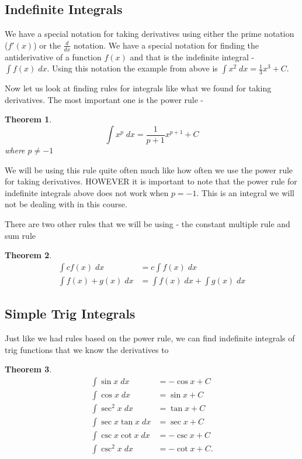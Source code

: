 \documentclass[12pt,reqno]{article}
\newtheorem{Theorem}{Theorem}
\theoremstyle{definition}
\begin{document}
\subsection{Indefinite Integrals} 

We have a special notation for taking derivatives using either the prime notation ($f'(x)$) or the $\frac{d}{dx}$ notation. We have a special notation for finding the antiderivative of a function $f(x)$ and that is the indefinite integral - $\int f(x) \; dx$.  Using this notation the example from above is $\int x^2 \; dx = \frac{1}{3} x^3 + C$.  

Now let us look at finding rules for integrals like what we found for taking derivatives. The most important one is the power rule - 
\begin{Theorem}
	$$\int x^p \; dx = \frac{1}{p + 1} x^{p  +  1} + C $$
	where $p \neq -1$
\end{Theorem}

We will be using this rule quite often much like how often we use the power rule for taking derivatives. HOWEVER it is important to note that the power rule for indefinite integrals above does not work when $p = - 1$. This is an integral we will not be dealing with in this course. 

There are two other rules that we will be using - the constant multiple rule and sum rule
\begin{Theorem}
	\begin{align*}
		\int c f(x) \; dx &= c \int f(x) \; dx \\
		\int f(x) + g(x) \; dx &= \int f(x) \; dx + \int g(x) \; dx
	\end{align*}
\end{Theorem}

\subsection{Simple Trig Integrals}

Just like we had rules based on the power rule, we can find indefinite integrals of trig functions that we know the derivatives to 
\begin{Theorem}
	\begin{align*}
		\int \sin x \; dx &= - \cos x + C \\
		\int \cos x \; dx &= \sin x + C \\
		\int \sec^2 x \; dx &= \tan x + C \\
		\int \sec x \tan x \; dx &= \sec x + C \\
		\int \csc x \cot x \; dx &= - \csc x + C \\
		\int \csc^2 x \; dx &= -\cot x + C .
	\end{align*}
\end{Theorem}
\end{document}
